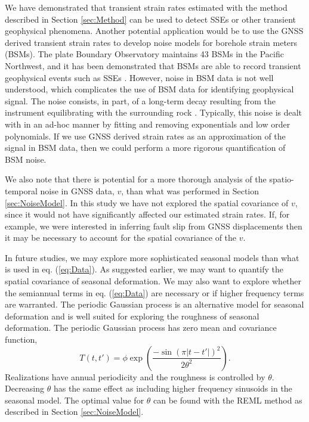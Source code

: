 \documentclass[10pt,letter]{article}
\begin{document}
We have demonstrated that transient strain rates estimated with the method described in Section \ref{sec:Method} can be used to detect SSEs or other transient geophysical phenomena. Another potential application would be to use the GNSS derived transient strain rates to develop noise models for borehole strain meters (BSMs). The plate Boundary Observatory maintains 43 BSMs in the Pacific Northwest, and it has been demonstrated that BSMs are able to record transient geophysical events such as SSEs \citep[e.g.,][]{Dragert2011}. However, noise in BSM data is not well understood, which complicates the use of BSM data for identifying geophysical signal. The noise consists, in part, of a long-term decay resulting from the instrument equilibrating with the surrounding rock \citep{Gladwin1987}. Typically, this noise is dealt with in an ad-hoc manner by fitting and removing exponentials and low order polynomials. If we use GNSS derived strain rates as an approximation of the signal in BSM data, then we could perform a more rigorous quantification of BSM noise.    

We also note that there is potential for a more thorough analysis of the spatio-temporal noise in GNSS data, $v$, than what was performed in Section \ref{sec:NoiseModel}. In this study we have not explored the spatial covariance of $v$, since it would not have significantly affected our estimated strain rates. If, for example, we were interested in inferring fault slip from GNSS displacements then it may be necessary to account for the spatial covariance of the $v$.  

In future studies, we may explore more sophisticated seasonal models than what is used in eq. (\ref{eq:Data}). As suggested earlier, we may want to quantify the spatial covariance of seasonal deformation. We may also want to explore whether the semiannual terms in eq. (\ref{eq:Data}) are necessary or if higher frequency terms are warranted.  The periodic Gaussian process \citep{Mackay1998} is an alternative model for seasonal deformation and is well suited for exploring the roughness of seasonal deformation.  The periodic Gaussian process has zero mean and covariance function,
\begin{equation}\label{eq:Periodic}
T(t,t') = \phi \exp\left(\frac{-\sin(\pi|t - t'|)^2}{2\theta^2}\right).
\end{equation}
Realizations have annual periodicity and the roughness is controlled by $\theta$. Decreasing $\theta$ has the same effect as including higher frequency sinusoids in the seasonal model. The optimal value for $\theta$ can be found with the REML method as described in Section \ref{sec:NoiseModel}. 
\end{document}
